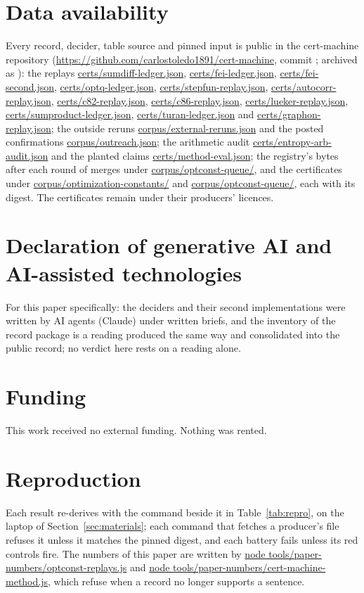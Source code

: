 \documentclass[preprint,11pt,authoryear,a4paper]{elsarticle}
\begin{document}
\section*{Data availability}
Every record, decider, table source and pinned input is public in the cert-machine repository (\url{https://github.com/carlostoledo1891/cert-machine}, commit \OcCommit; archived as \citealp{CMArchive}): the replays \url{certs/sumdiff-ledger.json}, \url{certs/fei-ledger.json}, \url{certs/fei-second.json}, \url{certs/optq-ledger.json}, \url{certs/stepfun-replay.json}, \url{certs/autocorr-replay.json}, \url{certs/c82-replay.json}, \url{certs/c86-replay.json}, \url{certs/lueker-replay.json}, \url{certs/sumproduct-ledger.json}, \url{certs/turan-ledger.json} and \url{certs/graphon-replay.json}; the outside reruns \url{corpus/external-reruns.json} and the posted confirmations \url{corpus/outreach.json}; the arithmetic audit \url{certs/entropy-arb-audit.json} and the planted claims \url{certs/method-eval.json}; the registry's bytes after each round of merges under \url{corpus/optconst-queue/}, and the certificates under \url{corpus/optimization-constants/} and \url{corpus/optconst-queue/}, each with its digest. The certificates remain under their producers' licences.

\section*{Declaration of generative AI and AI-assisted technologies}
\cmaideclaration{} For this paper specifically: the deciders and their second implementations were written by AI agents (Claude) under written briefs, and the inventory of the record package is a reading produced the same way and consolidated into the public record; no verdict here rests on a reading alone.

\section*{Funding}
This work received no external funding. Nothing was rented.

\appendix
\section{Reproduction}\label{app:repro}\setcounter{table}{0}

Each result re-derives with the command beside it in Table~\ref{tab:repro}, on the laptop of Section~\ref{sec:materials}; each command that fetches a producer's file refuses it unless it matches the pinned digest, and each battery fails unless its red controls fire. The numbers of this paper are written by \url{node tools/paper-numbers/optconst-replays.js} and \url{node tools/paper-numbers/cert-machine-method.js}, which refuse when a record no longer supports a sentence.
\end{document}
